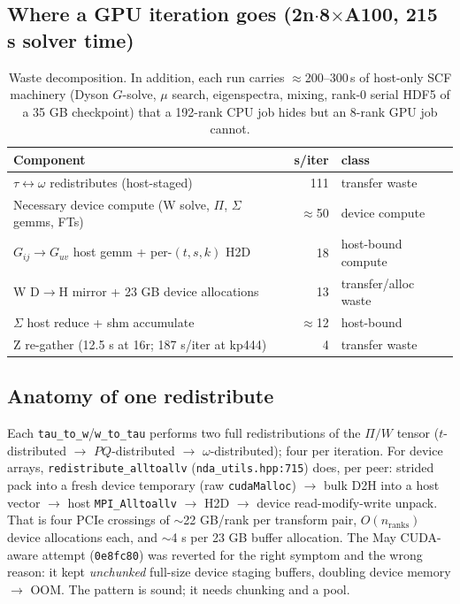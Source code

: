 \documentclass[11pt]{article}
\begin{document}
\subsection{Where a GPU iteration goes (2n$\cdot$8$\times$A100, 215 s solver time)}
\begin{table}[H]\small\centering
\begin{tabular}{@{}lrl@{}}
\toprule
Component & s/iter & class \\
\midrule
$\tau\!\leftrightarrow\!\omega$ redistributes (host-staged) & 111 & transfer waste \\
Necessary device compute (W solve, $\Pi$, $\Sigma$ gemms, FTs) & $\approx$50 & device compute \\
$G_{ij}\!\rightarrow\!G_{uv}$ host gemm + per-$(t,s,k)$ H2D & 18 & host-bound compute \\
W D$\rightarrow$H mirror + 23 GB device allocations & 13 & transfer/alloc waste \\
$\Sigma$ host reduce + shm accumulate & $\approx$12 & host-bound \\
Z re-gather (12.5 s at 16r; 187 s/iter at kp444) & 4 & transfer waste \\
\bottomrule
\end{tabular}
\caption{Waste decomposition. In addition, each run carries $\approx$200--300\,s of
host-only SCF machinery (Dyson $G$-solve, $\mu$ search, eigenspectra, mixing, rank-0
serial HDF5 of a 35 GB checkpoint) that a 192-rank CPU job hides but an 8-rank GPU
job cannot.}
\end{table}

\subsection{Anatomy of one redistribute}
Each \texttt{tau\_to\_w}/\texttt{w\_to\_tau} performs two full redistributions of the
$\Pi/W$ tensor ($t$-distributed $\rightarrow$ $PQ$-distributed $\rightarrow$
$\omega$-distributed); four per iteration. For device arrays,
\texttt{redistribute\_alltoallv} (\texttt{nda\_utils.hpp:715}) does, per peer: strided
pack into a fresh device temporary (raw \texttt{cudaMalloc}) $\rightarrow$ bulk D2H into
a host vector $\rightarrow$ host \texttt{MPI\_Alltoallv} $\rightarrow$ H2D $\rightarrow$
device read-modify-write unpack. That is four PCIe crossings of $\sim$22 GB/rank per
transform pair, $O(n_{\mathrm{ranks}})$ device allocations each, and $\sim$4 s per 23 GB
buffer allocation. The May CUDA-aware attempt (\texttt{0e8fc80}) was reverted for the
right symptom and the wrong reason: it kept \emph{unchunked} full-size device staging
buffers, doubling device memory $\rightarrow$ OOM. The pattern is sound; it needs
chunking and a pool.
\end{document}
